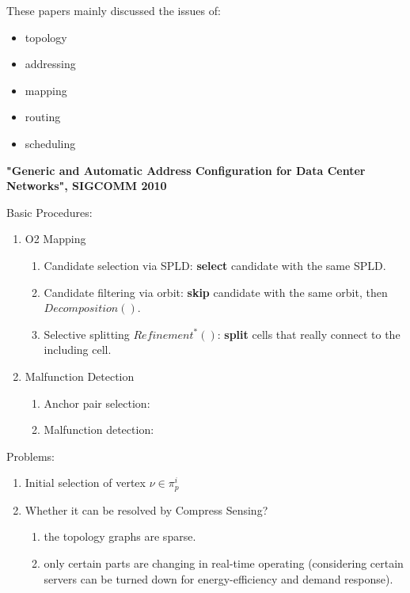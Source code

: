 \documentclass[journal,onecolumn,11pt]{IEEEtran}
\begin{document}
These papers mainly discussed the issues of:
\begin{itemize}
  \item topology \cite{Al-Fares:2008:SCD:1402958.1402967,Greenberg:2009:VSF:1592568.1592576,Guo:2008:DSF:1402958.1402968,Guo:2009:BHP:1592568.1592577}
  \item addressing \cite{Al-Fares:2008:SCD:1402958.1402967,Greenberg:2009:VSF:1592568.1592576}
  \item mapping \cite{Chen:2010:GAA:1851182.1851190,Greenberg:2009:VSF:1592568.1592576}
  \item routing \cite{Guo:2008:DSF:1402958.1402968,Guo:2009:BHP:1592568.1592577}
  \item scheduling \cite{Al-Fares:2008:SCD:1402958.1402967,Halperin:2011:ADC:2018436.2018442}
\end{itemize}

\textbf{"Generic and Automatic Address Configuration for Data Center Networks", SIGCOMM 2010}

Basic Procedures:
\begin{enumerate}
  \item O2 Mapping
  \begin{enumerate}
    \item Candidate selection via SPLD: \textbf{select} candidate with the same SPLD.
    \item Candidate filtering via orbit: \textbf{skip} candidate with the same orbit, then $Decomposition()$.
    \item Selective splitting $Refinement^*()$: \textbf{split} cells that really connect to the including cell.
  \end{enumerate}
  \item Malfunction Detection
  \begin{enumerate}
    \item Anchor pair selection:
    \item Malfunction detection:
  \end{enumerate}
\end{enumerate}

Problems:
\begin{enumerate}
  \item Initial selection of vertex $\nu\in\pi_p^i$
  \item Whether it can be resolved by Compress Sensing?
  \begin{enumerate}
    \item the topology graphs are sparse.
    \item only certain parts are changing in real-time operating (considering certain servers can be turned down for energy-efficiency and demand response).
  \end{enumerate}
\end{enumerate}
\end{document}
